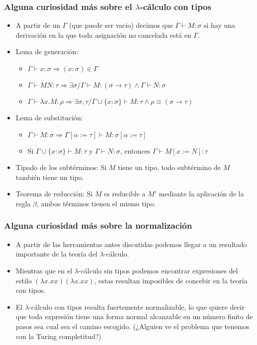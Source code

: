 \documentclass[spanish, a4paper, 12pt, final, slideColor, nototal, colorBG, pdf, noaccumulate, darkblue] {beamer}
\begin{document}
\begin{frame}
    \frametitle{Alguna curiosidad más sobre el $\lambda$-cálculo con tipos}
    \begin{itemize}
        \item A partir de un $\Gamma$ (que puede ser vacio) decimos que $\Gamma \vdash M:\sigma$ si hay una derivación en la que toda asignación no cancelada está en $\Gamma$.
        \item Lema de generación:
        \begin{itemize}
            \item $\Gamma \vdash x:\sigma \Rightarrow (x:\sigma)\in \Gamma$
            \item $\Gamma \vdash MN:\tau \Rightarrow \exists \sigma /\Gamma \vdash M:(\sigma \rightarrow \tau) \wedge \Gamma \vdash N : \sigma$
            \item $\Gamma \vdash \lambda x.M:\rho \Rightarrow \exists \sigma, \tau / \Gamma \cup \{x:\sigma \} \vdash M:\tau \wedge \rho \equiv (\sigma \rightarrow \tau)$
        \end{itemize}
        \item Lema de substitución:
        \begin{itemize}
            \item $\Gamma \vdash M:\sigma \Rightarrow \Gamma[\alpha:=\tau] \vdash M:\sigma[\alpha:=\tau]$
            \item Si $\Gamma \cup \{x:\sigma \} \vdash M:\tau$ y $\Gamma \vdash N:\sigma$, entonces $\Gamma \vdash M[x:=N]:\tau$
        \end{itemize}
        \item Tipado de los subtérminos: Si $M$ tiene un tipo, todo subtérmino de $M$ también tiene un tipo.
        \item Teorema de reducción: Si $M$ es reducible a $M'$ mediante la aplicación de la regla $\beta$, ambos términos tienen el mismo tipo.
    \end{itemize}
\end{frame}
\begin{frame}
    \frametitle{Alguna curiosidad más sobre la normalización}
    \begin{itemize}
        \item A partir de las herramientas antes discutidas podemos llegar a un resultado importante de la teoría del $\lambda$-cálculo.
        \item Mientras que en el $\lambda$-cálculo sin tipos podemos encontrar expresiones del estilo $(\lambda x.xx)(\lambda x.xx)$, estas resultan imposibles de concebir en la teoría con tipos.
        \item El $\lambda$-cálculo con tipos resulta fuertemente normalizable, lo que quiere decir que toda expresión tiene una forma normal alcanzable en un número finito de pasos sea cual sea el camino escogido. (¿Alguien ve el problema que tenemos con la Turing completitud?)
    \end{itemize}
\end{frame}
\end{document}
